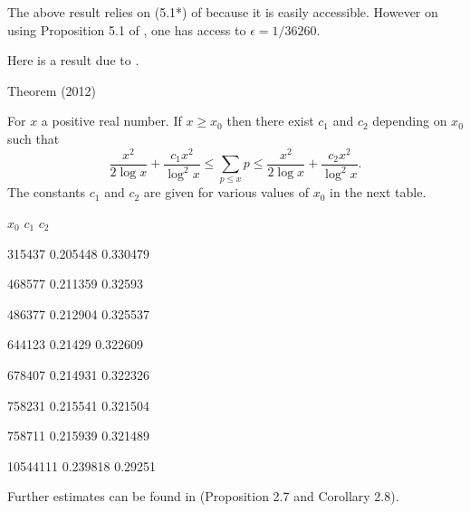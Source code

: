 The above result  relies on (5.1*) of
\cite{Schoenfeld*76}
because it is easily accessible. However on using
Proposition 5.1 of
\cite{Dusart*07},
one has access to $\epsilon=1/36260$.

\par 
  \par 
Here is a result due to 
\cite{Trevino*12}.
\par 
\begin{thm}{Theorem (2012)}

For $x$ a positive real number. If $x \geq x_0$ then there exist $c_1$
and $c_2$ depending on $x_0$ such that
$$
\frac{x^2}{2\log{x}} +
\frac{c_1 x^2}{\log^2{x}} \leq \sum_{p \leq x} p \leq
\frac{x^2}{2\log{x}} + \frac{c_2 x^2}{\log^2{x}}.
$$
The constants
$c_1$ and $c_2$ are given for various values of $x_0$ in the next
table.

  
  
    
      $x_0$
      $c_1$
      $c_2$
    
  
  
    315437
    0.205448
    0.330479
  
  
    468577
    0.211359
    0.32593
  
  
    486377
    0.212904
    0.325537
  
  
    644123
    0.21429
    0.322609
  
  
    678407
    0.214931
    0.322326
  
  
    758231
    0.215541
    0.321504
  
  
    758711
    0.215939
    0.321489
  
  
    10544111
    0.239818
    0.29251
  
  

\end{thm}

\par 

Further estimates can be found in
 \cite{Axler*19}
(Proposition 2.7 and Corollary 2.8).

